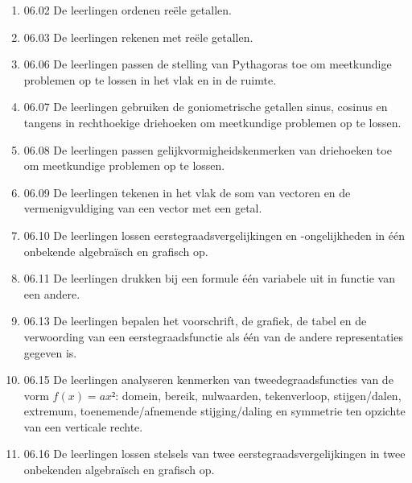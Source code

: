 \documentclass{article}
\begin{document}
\begin{enumerate}

    
    \item 06.02 De leerlingen ordenen reële getallen.
    
    \item 06.03 De leerlingen rekenen met reële getallen.
    
    \item 06.06 De leerlingen passen de stelling van Pythagoras toe om meetkundige problemen op te lossen in het vlak en in de ruimte.
    
    \item 06.07 De leerlingen gebruiken de goniometrische getallen sinus, cosinus en tangens in rechthoekige driehoeken om meetkundige problemen op te lossen.
    
    \item 06.08 De leerlingen passen gelijkvormigheidskenmerken van driehoeken toe om meetkundige problemen op te lossen.
    
    \item 06.09 De leerlingen tekenen in het vlak de som van vectoren en de vermenigvuldiging van een vector met een getal.
    
    \item 06.10 De leerlingen lossen eerstegraadsvergelijkingen en -ongelijkheden in één onbekende algebraïsch en grafisch op.
    
    \item 06.11 De leerlingen drukken bij een formule één variabele uit in functie van een andere.
    
    \item 06.13 De leerlingen bepalen het voorschrift, de grafiek, de tabel en de verwoording van een eerstegraadsfunctie als één van de andere representaties gegeven is.
    
    \item 06.15 De leerlingen analyseren kenmerken van tweedegraadsfuncties van de vorm \(f(x)=ax²\): domein, bereik, nulwaarden, tekenverloop, stijgen/dalen, extremum, toenemende/afnemende stijging/daling en symmetrie ten opzichte van een verticale rechte.
    
    \item 06.16 De leerlingen lossen stelsels van twee eerstegraadsvergelijkingen in twee onbekenden algebraïsch en grafisch op.
    
\end{enumerate}
\end{document}
